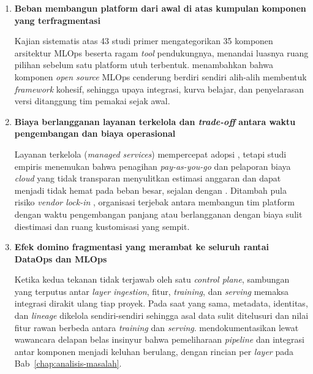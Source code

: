 \vspace{0.5em}
\begin{enumerate}
    \item \textbf{Beban membangun platform dari awal di atas kumpulan komponen yang terfragmentasi}

    Kajian sistematis \textcite{najafabadi2024analysis} atas 43 studi primer mengategorikan 35 komponen arsitektur MLOps beserta ragam \textit{tool} pendukungnya, menandai luasnya ruang pilihan sebelum satu platform utuh terbentuk. \textcite{burgueno2025toward} menambahkan bahwa komponen \textit{open source} MLOps cenderung berdiri sendiri alih-alih membentuk \textit{framework} kohesif, sehingga upaya integrasi, kurva belajar, dan penyelarasan versi ditanggung tim pemakai sejak awal.

    \vspace{0.5em}

    \item \textbf{Biaya berlangganan layanan terkelola dan \textit{trade-off} antara waktu pengembangan dan biaya operasional}

    Layanan terkelola (\textit{managed services}) mempercepat adopsi \autocite{li2023managed}, tetapi studi empiris \textcite{hamza2024serverlesscost} menemukan bahwa penagihan \textit{pay-as-you-go} dan pelaporan biaya \textit{cloud} yang tidak transparan menyulitkan estimasi anggaran dan dapat menjadi tidak hemat pada beban besar, sejalan dengan \textcite{adusumilli2025serverless}. Ditambah pula risiko \textit{vendor lock-in} \autocite{mo2023serverless}, organisasi terjebak antara membangun tim platform dengan waktu pengembangan panjang atau berlangganan dengan biaya sulit diestimasi dan ruang kustomisasi yang sempit.

    \vspace{0.5em}

    \item \textbf{Efek domino fragmentasi yang merambat ke seluruh rantai DataOps dan MLOps}

    Ketika kedua tekanan tidak terjawab oleh satu \textit{control plane}, sambungan yang terputus antar \textit{layer} \textit{ingestion}, fitur, \textit{training}, dan \textit{serving} memaksa integrasi dirakit ulang tiap proyek. Pada saat yang sama, metadata, identitas, dan \textit{lineage} dikelola sendiri-sendiri sehingga asal data sulit ditelusuri dan nilai fitur rawan berbeda antara \textit{training} dan \textit{serving}. \textcite{shankar2022operationalizing} mendokumentasikan lewat wawancara delapan belas insinyur bahwa pemeliharaan \textit{pipeline} dan integrasi antar komponen menjadi keluhan berulang, dengan rincian per \textit{layer} pada Bab~\ref{chap:analisis-masalah}.
\end{enumerate}

